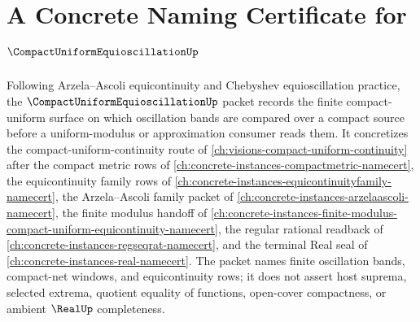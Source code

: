 \chapter{A Concrete Naming Certificate for $\CompactUniformEquioscillationUp$}
\label{ch:concrete-instances-compact-uniform-equioscillation-namecert}

Following Arzela--Ascoli equicontinuity and Chebyshev equioscillation practice, the $\CompactUniformEquioscillationUp$ packet records the finite compact-uniform surface on which oscillation bands are compared over a compact source before a uniform-modulus or approximation consumer reads them. It concretizes the compact-uniform-continuity route of \autoref{ch:visions-compact-uniform-continuity} after the compact metric rows of \autoref{ch:concrete-instances-compactmetric-namecert}, the equicontinuity family rows of \autoref{ch:concrete-instances-equicontinuityfamily-namecert}, the Arzela--Ascoli family packet of \autoref{ch:concrete-instances-arzelaascoli-namecert}, the finite modulus handoff of \autoref{ch:concrete-instances-finite-modulus-compact-uniform-equicontinuity-namecert}, the regular rational readback of \autoref{ch:concrete-instances-regseqrat-namecert}, and the terminal Real seal of \autoref{ch:concrete-instances-real-namecert}. The packet names finite oscillation bands, compact-net windows, and equicontinuity rows; it does not assert host suprema, selected extrema, quotient equality of functions, open-cover compactness, or ambient $\RealUp$ completeness.

